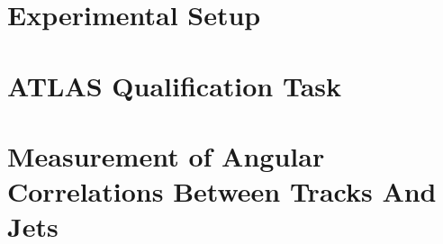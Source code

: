 \documentclass[fullpage]{uiucthesis2009}
\begin{document}
\chapter{Experimental Setup}
\label{sec:setup}


%

\chapter{ATLAS Qualification Task}
\label{sec:qualification}


%


\chapter{Measurement of Angular Correlations Between Tracks And Jets}
\label{sec:mainanalysis}



%

%
\end{document}
